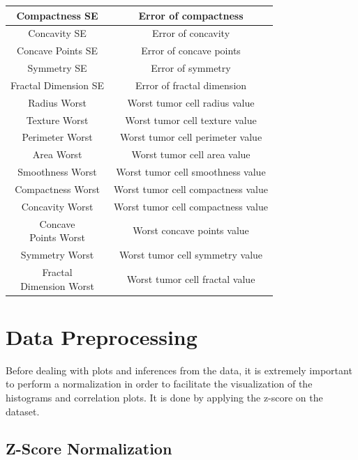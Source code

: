 \documentclass[conference]{IEEEtran}
\begin{document}
\begin{table}[htbp]
\begin{center}
\begin{tabular}{|c|c|}
    \hline
    Compactness SE & Error of compactness \\
    \hline
    Concavity SE & Error of concavity \\
    \hline
    Concave Points SE & Error of concave points \\
    \hline
    Symmetry SE & Error of symmetry \\
    \hline
    Fractal Dimension SE & Error of fractal dimension \\
    \hline
    Radius Worst & Worst tumor cell radius value \\
    \hline
    Texture Worst & Worst tumor cell texture value \\
    \hline
    Perimeter Worst &  Worst tumor cell perimeter value\\
    \hline
    Area Worst &  Worst tumor cell area value \\
    \hline
    Smoothness Worst & Worst tumor cell smoothness value \\
    \hline
    Compactness Worst &  Worst tumor cell compactness value \\
    \hline
    Concavity Worst & Worst tumor cell compactness value \\
    \hline
    \makecell{Concave \\ Points Worst} & Worst concave points value \\
    \hline
    Symmetry Worst & Worst tumor cell symmetry value \\
    \hline
    \makecell{Fractal \\ Dimension Worst} & Worst tumor cell fractal value \\
    \hline
\end{tabular}
\label{tab:Summary}
\end{center}
\end{table}

\section{Data Preprocessing}
Before dealing with plots and inferences from the data, it is extremely important to 
perform a normalization in order to facilitate the visualization of the histograms 
and correlation plots. It is done by applying the z-score on the dataset.

\subsection{Z-Score Normalization}
\end{document}
